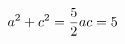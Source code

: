\documentclass[preview]{standalone}
\begin{document}
\begin{align*}
\special{dvisvgm:raw <g id='unique000'>}a^2+c^2=\frac{5}{2}ac=5\special{dvisvgm:raw </g>}
\end{align*}
\end{document}
